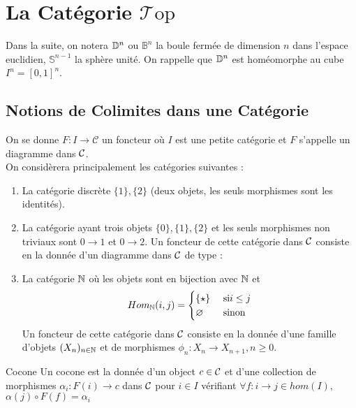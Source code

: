 \documentclass{cours}
\newcommand{\Top}{\mathcal{T}\mathrm{op}}
\begin{document}
\section{La Catégorie $\Top$}
Dans la suite, on notera $\mathbb{D}^{n}$ ou $\mathbb{B}^{n}$ la boule fermée de dimension $n$ dans l'espace euclidien, $\mathbb{S}^{n-1}$ la sphère unité. On rappelle que $\mathbb{D}^{n}$ est homéomorphe au cube $I^{n} = [0, 1]^{n}$.

\subsection{Notions de Colimites dans une Catégorie}
On se donne $F : I \to \mathcal{C}$ un foncteur où $I$ est une petite catégorie et $F$ s'appelle un diagramme dans $\mathcal{C}$.\\
On considèrera principalement les catégories suivantes : 
\begin{enumerate}
    \item \label{cat:discrete}La catégorie discrète $\{1\}, \{2\}$ (deux objets, les seuls morphismes sont les identités).
    \item \label{cat:threes}La catégorie ayant trois objets $\{0\}, \{1\}, \{2\}$ et les seuls morphismes non triviaux sont $0 \to 1$ et $0 \to 2$. Un foncteur de cette catégorie dans $\mathcal{C}$ consiste en la donnée d'un diagramme dans $\mathcal{C}$ de type :
    \begin{center}
    \end{center}
    \item \label{cat:N}La catégorie $\mathbb{N}$ où les objets sont en bijection avec $\mathbb{N}$ et 
    \[
        Hom_{\mathbb{N}}(i, j) = \begin{cases}
            \{\star\} & \text{ si} i \leq j\\
            \varnothing & \text{ sinon}
        \end{cases}
    \]
    Un foncteur de cette catégorie dans $\mathcal{C}$ consiste en la donnée d'une famille d'objets $(X_{n})_{n \in \mathbb{N}}$ et de morphismes $\phi_{n} : X_{n} \to X_{n + 1}, n\geq 0$.
\end{enumerate}

\begin{définition}{Cocone}{}
    Un cocone est la donnée d'un object $c \in \mathcal{C}$ et d'une collection de morphismes $\alpha_{i} : F(i) \to c$ dans $\mathcal{C}$ pour $i \in I$ vérifiant $\forall f : i \to j \in hom(I)$, $\alpha(j) \circ F(f) = \alpha_{i}$
\end{définition}
\end{document}
